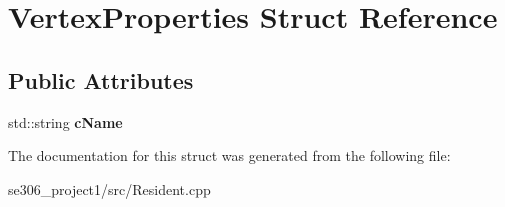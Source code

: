 \hypertarget{structVertexProperties}{\section{Vertex\-Properties Struct Reference}
\label{structVertexProperties}
}
\subsection*{Public Attributes}
\begin{DoxyCompactItemize}
\item 
\hypertarget{structVertexProperties_a69ef6b8d4d8a32075218eac37747b921}{std\-::string {\bfseries c\-Name}}\label{structVertexProperties_a69ef6b8d4d8a32075218eac37747b921}

\end{DoxyCompactItemize}


The documentation for this struct was generated from the following file\-:\begin{DoxyCompactItemize}
\item 
se306\-\_\-project1/src/Resident.\-cpp\end{DoxyCompactItemize}
